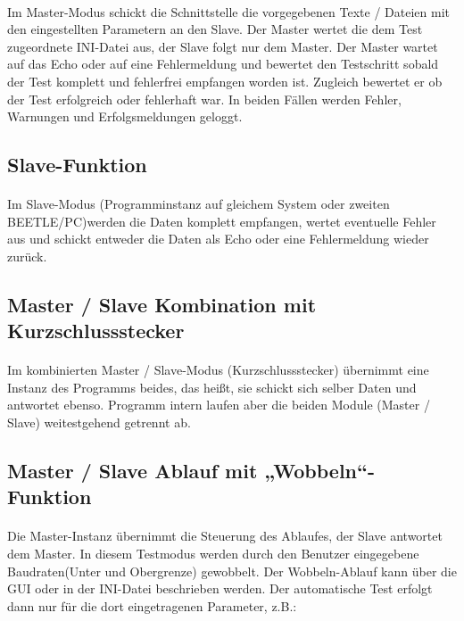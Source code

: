 \paragraph{}
Im Master-Modus schickt die Schnittstelle die vorgegebenen Texte / Dateien mit den eingestellten Parametern an den Slave. Der Master wertet die dem Test zugeordnete INI-Datei aus, der Slave folgt nur dem Master. Der Master wartet auf das Echo oder auf eine Fehlermeldung und bewertet den Testschritt sobald der Test komplett und fehlerfrei empfangen worden ist. Zugleich bewertet er ob der Test erfolgreich oder fehlerhaft war. In beiden Fällen werden Fehler, Warnungen und Erfolgsmeldungen geloggt.


\subsection{Slave-Funktion}
\paragraph{}
Im Slave-Modus (Programminstanz auf gleichem System oder zweiten BEETLE/PC)werden die Daten komplett empfangen, wertet eventuelle Fehler aus und schickt entweder die Daten als Echo oder eine Fehlermeldung wieder zurück. 

\subsection{Master / Slave Kombination mit Kurzschlussstecker}
\paragraph{}
Im kombinierten Master / Slave-Modus (Kurzschlussstecker) übernimmt eine Instanz des Programms beides, das heißt, sie schickt sich selber Daten und antwortet ebenso. Programm intern laufen aber die beiden Module (Master / Slave) weitestgehend getrennt ab.

\subsection{Master / Slave Ablauf mit „Wobbeln“-Funktion}
\paragraph{}
Die Master-Instanz übernimmt die Steuerung des Ablaufes, der Slave antwortet dem Master. In diesem Testmodus werden durch den Benutzer eingegebene Baudraten(Unter und Obergrenze) gewobbelt. Der Wobbeln-Ablauf kann über die GUI oder in der INI-Datei beschrieben werden. Der automatische Test erfolgt dann nur für die dort eingetragenen Parameter, z.B.:

